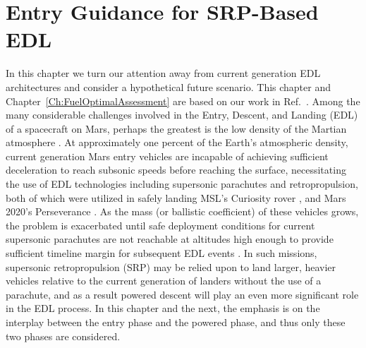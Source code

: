 \chapter{Entry Guidance for SRP-Based EDL}\label{Ch:FuelOptimalPaper}
In this chapter we turn our attention away from current generation EDL architectures and consider a hypothetical future scenario. This chapter and Chapter~\ref{Ch:FuelOptimalAssessment} are based on our work in Ref.~\cite{NoyesSRP}.
Among the many considerable challenges involved in the Entry, Descent, and Landing (EDL) of a spacecraft on Mars, perhaps the greatest is the low density of the Martian atmosphere \cite{BraunMarsEDL, joel_dissertation}. At approximately one percent of the Earth's atmospheric density, current generation Mars entry vehicles are incapable of achieving sufficient deceleration to reach subsonic speeds before reaching the surface, necessitating the use of EDL technologies including supersonic parachutes and retropropulsion, both of which were utilized in safely landing MSL's Curiosity rover \cite{MSL_EDL}, and Mars 2020's Perseverance \cite{M2020_EDL}. As the mass (or ballistic coefficient) of these vehicles grows, the problem is exacerbated until safe deployment conditions for current supersonic parachutes are not reachable at altitudes high enough to provide sufficient timeline margin for subsequent EDL events \cite{BraunMarsEDL}. In such missions, supersonic retropropulsion (SRP) may be relied upon to land larger, heavier vehicles relative to the current generation of landers without the use of a parachute, and as a result powered descent will play an even more significant role in the EDL process. In this chapter and the next, the emphasis is on the interplay between the entry phase and the powered phase, and thus only these two phases are considered.

